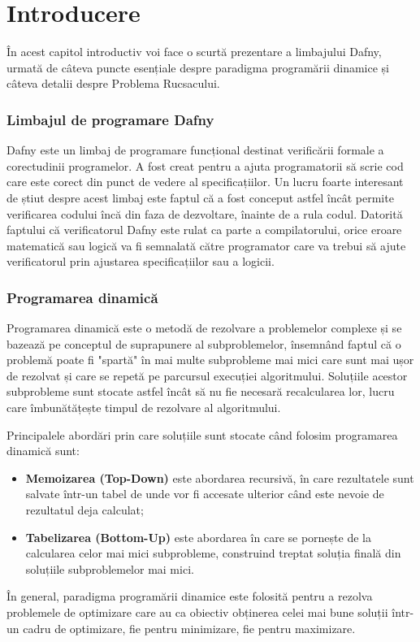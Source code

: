 \chapter*{Introducere} 

\begin{sloppypar}
În acest capitol introductiv voi face o scurtă prezentare a limbajului Dafny, urmată de câteva puncte esențiale despre paradigma programării dinamice și câteva detalii despre Problema Rucsacului.

\subsection*{Limbajul de programare Dafny}
Dafny este un limbaj de programare funcțional destinat verificării formale a corectudinii programelor. A fost creat pentru a ajuta programatorii să scrie cod care este corect din punct de vedere al specificațiilor. Un lucru foarte interesant de știut despre acest limbaj este faptul că a fost conceput astfel încât permite verificarea codului încă din faza de dezvoltare, înainte de a rula codul. Datorită faptului că verificatorul Dafny este rulat ca parte a compilatorului, orice eroare matematică sau logică va fi semnalată către programator care va trebui să ajute verificatorul prin ajustarea specificațiilor sau a logicii.

\subsection*{Programarea dinamică}
Programarea dinamică este o metodă de rezolvare a problemelor complexe și se bazează pe conceptul de suprapunere al subproblemelor, însemnând faptul că o problemă poate fi "spartă" în mai multe subprobleme mai mici care sunt mai ușor de rezolvat și care se repetă pe parcursul execuției algoritmului. 
Soluțiile acestor subprobleme sunt stocate astfel încât să nu fie necesară recalcularea lor, lucru care îmbunătățește timpul de rezolvare al  algoritmului. \par 
Principalele abordări prin care soluțiile sunt stocate când folosim programarea dinamică sunt:
\begin{itemize}
     \item \textbf{Memoizarea (Top-Down)} este abordarea recursivă, în care rezultatele sunt salvate într-un tabel de unde vor fi accesate ulterior când este nevoie de rezultatul deja calculat;
     \item \textbf{Tabelizarea (Bottom-Up)} este abordarea în care se pornește de la calcularea celor mai mici subprobleme, construind treptat soluția finală din soluțiile subproblemelor mai mici.
\end{itemize} \par
În general, paradigma programării dinamice este folosită pentru a rezolva problemele de optimizare care au ca obiectiv obținerea celei mai bune soluții într-un cadru de optimizare, fie pentru minimizare, fie pentru maximizare. \par



\end{sloppypar}
